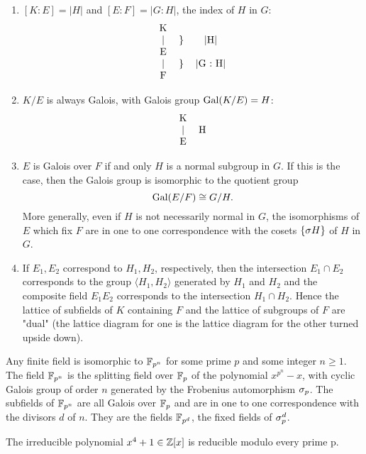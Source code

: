 \begin{thm}
\begin{enumerate}
\item $[K:E] = |H|$ and $[E:F] = |G:H|$, the index of $H$ in $G$:
\[\begin{tabular}{ccc}
K & & \\
| & \} & |H|\\
E & & \\
| & \} & |G\ :\ H|\\
F & & 
\end{tabular}\]
\item $K/E$ is always Galois, with Galois group $\text{Gal}(K/E) = H$:
\[\begin{tabular}{cc}
K & \\
| & H\\
E & 
\end{tabular}\]
\item $E$ is Galois over $F$ if and only $H$ is a normal subgroup in $G$. If this is the case, then the Galois group is isomorphic to the quotient group 
\[\text{Gal}(E/F)\cong G/H.\]
More generally, even if $H$ is not necessarily normal in $G$, the isomorphisms of $E$ which fix $F$ are in one to one correspondence with the cosets $\{\sigma H\}$ of $H$ in $G$.
\item If $E_1, E_2$ correspond to $H_1, H_2$, respectively, then the intersection $E_1\cap E_2$ corresponds to the group $\langle H_1, H_2\rangle$ generated by $H_1$ and $H_2$ and the composite field $E_1E_2$ corresponds to the intersection $H_1\cap H_2$. Hence the lattice of subfields of $K$ containing $F$ and the lattice of subgroups of $F$ are "dual" (the lattice diagram for one is the lattice diagram for the other turned upside down).
\end{enumerate}
\end{thm}

\nl

\begin{prop}
Any finite field is isomorphic to $\mathbb{F}_{p^n}$ for some prime $p$ and some integer $n\geq 1$. The field $\mathbb{F}_{p^n}$ is the splitting field over $\mathbb{F}_p$ of the polynomial $x^{p^n} - x$, with cyclic Galois group of order $n$ generated by the Frobenius automorphism $\sigma_p$. The subfields of $\mathbb{F}_{p^n}$ are all Galois over $\mathbb{F}_p$ and are in one to one correspondence with the divisors $d$ of $n$. They are the fields $\mathbb{F}_{p^d}$, the fixed fields of $\sigma_p^d$.
\end{prop}

\nl

\begin{cor}
The irreducible polynomial $x^4 + 1\in \mathbb{Z}[x]$ is reducible modulo every prime p.
\end{cor}

